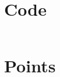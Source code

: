 \documentclass{article}
\begin{document}
\pagebreak

\section{Code}
\inputminted{python3}{main.py}

\section{Points} \label{points}

\end{document}
